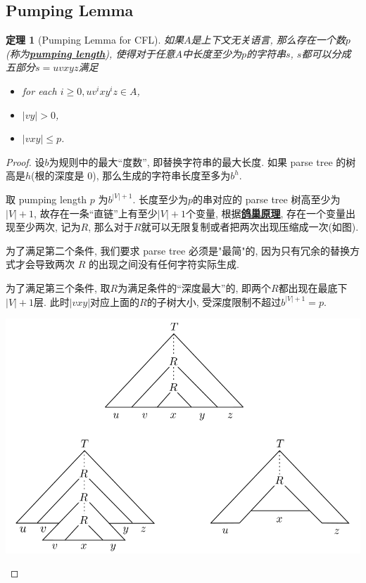 \documentclass[8pt]{article}
\theoremstyle{compact}
\newtheorem{theorem}{定理}[section]
\def\obj#1{\textbf{\uline{#1}}}
\def\le{\leqslant}
\def\ge{\geqslant}
\begin{document}
\subsection{Pumping Lemma}

\begin{theorem}[Pumping Lemma for CFL]
	如果$A$是上下文无关语言, 那么存在一个数$p$(称为\obj{pumping length}), 使得对于任意$A$中长度至少为$p$的字符串$s$, $s$都可以分成五部分$s = uvxyz$满足
	\begin{itemize}
		\item for each $i \ge 0, uv^ixy^iz \in A$,
		\item $|vy| > 0$,
		\item $|vxy| \le p$.
	\end{itemize}
\end{theorem}
\begin{proof}
	设$b$为规则中的最大“度数”, 即替换字符串的最大长度. 如果 parse tree 的树高是$h$(根的深度是 $0$), 那么生成的字符串长度至多为$b^h$. 

	取 pumping length $p$ 为$b^{|V|+1}$. 长度至少为$p$的串对应的 parse tree 树高至少为$|V| + 1$, 故存在一条“直链”上有至少$|V| + 1$个变量, 根据\obj{鸽巢原理}, 存在一个变量出现至少两次, 记为$R$, 那么对于$R$就可以无限复制或者把两次出现压缩成一次(如图). 

	为了满足第二个条件, 我们要求 parse tree 必须是"最简"的, 因为只有冗余的替换方式才会导致两次 $R$ 的出现之间没有任何字符实际生成.

	为了满足第三个条件, 取$R$为满足条件的“深度最大”的, 即两个$R$都出现在最底下$|V| + 1$层. 此时$|vxy|$对应上面的$R$的子树大小, 受深度限制不超过$b^{|V| + 1} = p$. 
	\begin{center}
		\includegraphics[scale=0.3]{pic/pumping_for_CFL.png}		
	\end{center}
\end{proof}
\end{document}
